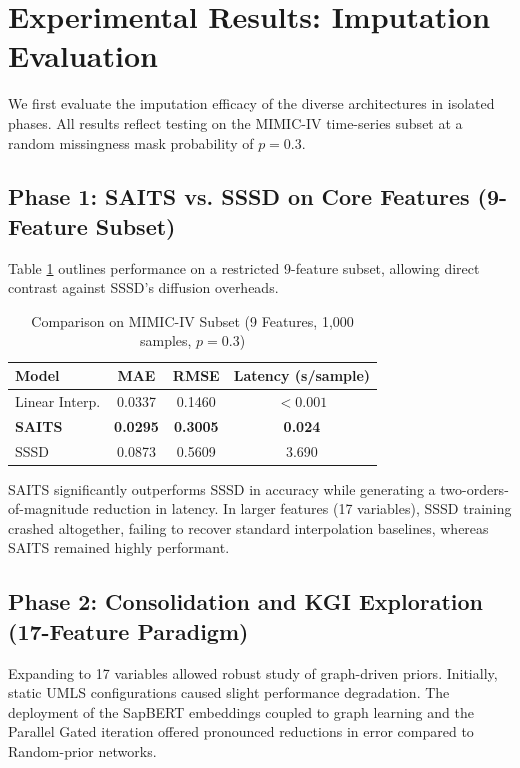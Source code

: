 \section{Experimental Results: Imputation Evaluation}
\label{sec:imputation_results}

We first evaluate the imputation efficacy of the diverse architectures in isolated phases. All results reflect testing on the MIMIC-IV time-series subset at a random missingness mask probability of $p=0.3$.

\subsection{Phase 1: SAITS vs. SSSD on Core Features (9-Feature Subset)}
Table \ref{tab:results_9feat} outlines performance on a restricted 9-feature subset, allowing direct contrast against SSSD's diffusion overheads.

\begin{table}[h]
\centering
\caption{Comparison on MIMIC-IV Subset (9 Features, 1,000 samples, $p=0.3$)}
\label{tab:results_9feat}
\begin{tabular}{@{}lccc@{}}
\toprule
\textbf{Model} & \textbf{MAE} & \textbf{RMSE} & \textbf{Latency (s/sample)} \\ \midrule
Linear Interp.  & 0.0337       & 0.1460        & $<0.001$                   \\ \midrule
\textbf{SAITS}  & \textbf{0.0295} & \textbf{0.3005} & \textbf{0.024}            \\
SSSD            & 0.0873       & 0.5609        & 3.690                      \\ \bottomrule
\end{tabular}
\end{table}
SAITS significantly outperforms SSSD in accuracy while generating a two-orders-of-magnitude reduction in latency. In larger features (17 variables), SSSD training crashed altogether, failing to recover standard interpolation baselines, whereas SAITS remained highly performant.

\subsection{Phase 2: Consolidation and KGI Exploration (17-Feature Paradigm)}
Expanding to 17 variables allowed robust study of graph-driven priors. Initially, static UMLS configurations caused slight performance degradation. The deployment of the SapBERT embeddings coupled to graph learning and the Parallel Gated iteration offered pronounced reductions in error compared to Random-prior networks. 

